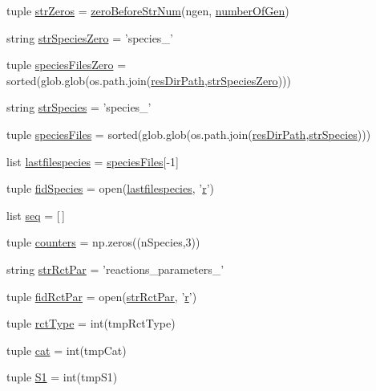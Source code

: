\begin{DoxyCompactItemize}
tuple \hyperlink{a00097_ac53f52471f3cf1ef18465a07dc930dff}{str\-Zeros} = \hyperlink{a00097_ac217c91fe2eee20671291adb12bbbbb2}{zero\-Before\-Str\-Num}(ngen, \hyperlink{a00097_acceae37ca98ccf6dc25c9f538fda386f}{number\-Of\-Gen})
\item 
string \hyperlink{a00097_a78927c369e0fe9deb29777c699af346f}{str\-Species\-Zero} = 'species\-\_\-'
\item 
tuple \hyperlink{a00097_a2f73b228eca2d5d0e45f781ccc21b253}{species\-Files\-Zero} = sorted(glob.\-glob(os.\-path.\-join(\hyperlink{a00097_a2c1728d3ec9815ec7cf41653e953524c}{res\-Dir\-Path},\hyperlink{a00097_a78927c369e0fe9deb29777c699af346f}{str\-Species\-Zero})))
\item 
string \hyperlink{a00097_a7ad6c119fecb41b02823a95f334daa4c}{str\-Species} = 'species\-\_\-'
\item 
tuple \hyperlink{a00097_a7e3b3a6b0c9305e60758bf5d44e7b0f6}{species\-Files} = sorted(glob.\-glob(os.\-path.\-join(\hyperlink{a00097_a2c1728d3ec9815ec7cf41653e953524c}{res\-Dir\-Path},\hyperlink{a00097_a7ad6c119fecb41b02823a95f334daa4c}{str\-Species})))
\item 
list \hyperlink{a00097_ac7070acb2aaeb8965c57e81b6308ddd5}{lastfilespecies} = \hyperlink{a00097_a7e3b3a6b0c9305e60758bf5d44e7b0f6}{species\-Files}\mbox{[}-\/1\mbox{]}
\item 
tuple \hyperlink{a00097_a240d5b3cd72043528f4b674a8ba00a33}{fid\-Species} = open(\hyperlink{a00097_ac7070acb2aaeb8965c57e81b6308ddd5}{lastfilespecies}, '\hyperlink{a00025_ac862e7284527eb913b1351c8bfb8e079}{r}')
\item 
list \hyperlink{a00097_a50a8f7f4bae0fd037961d91206f5178c}{seq} = \mbox{[}$\,$\mbox{]}
\item 
tuple \hyperlink{a00097_a6afffdd046bbc3bc4fbee34b561fcae5}{counters} = np.\-zeros((n\-Species,3))
\item 
string \hyperlink{a00097_ab59af27efe5462ef13ae45fd7330d0b3}{str\-Rct\-Par} = 'reactions\-\_\-parameters\-\_\-'
\item 
tuple \hyperlink{a00097_a64247b23c199d0b0d0d60f02ec8682e3}{fid\-Rct\-Par} = open(\hyperlink{a00097_ab59af27efe5462ef13ae45fd7330d0b3}{str\-Rct\-Par}, '\hyperlink{a00025_ac862e7284527eb913b1351c8bfb8e079}{r}')
\item 
tuple \hyperlink{a00097_abdc37f53b75138949fbbe9f9e42f1e6f}{rct\-Type} = int(tmp\-Rct\-Type)
\item 
tuple \hyperlink{a00097_a721a520fa04949579e29cb858dc00bf0}{cat} = int(tmp\-Cat)
\item 
tuple \hyperlink{a00097_a4ffac9566fa24baa2b27ccd97f9ffe1e}{S1} = int(tmp\-S1)

\end{DoxyCompactItemize}
